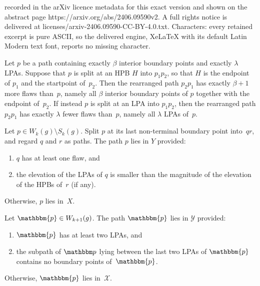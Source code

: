 \documentclass[10pt,a4paper]{amsart}
\newcommand{\lrcornerqed}[0]{}
\begin{document}
recorded in the arXiv licence metadata for this exact version and shown on the abstract page https://arxiv.org/abs/2406.09590v2. A full rights notice is delivered at licenses/arxiv-2406.09590-CC-BY-4.0.txt. Characters: every retained excerpt is pure ASCII, so the delivered engine, XeLaTeX with its default Latin Modern text font, reports no missing character.
\begin{obs}\label{obs:flaws}
    Let $p$ be a path containing exactly $\beta$ interior boundary points and exactly $\lambda$ LPAs.
    Suppose that $p$ is split at an HPB $H$ into $p_1p_2$, so that $H$ is the endpoint of $p_1$ and the startpoint of~$p_2$. Then the rearranged path $p_2p_1$ has exactly $\beta+1$ more flaws than~$p$, namely all $\beta$ interior boundary points of $p$ together with the endpoint of~$p_2$.
    If instead $p$ is split at an LPA into $p_1p_2$, then the rearranged path $p_2p_1$ has exactly $\lambda$ fewer flaws than~$p$, namely all $\lambda$ LPAs of~$p$.
    \lrcornerqed
\end{obs}

\begin{definition}
\label{def:domain_partition}
    Let $p \in W_k(g) \setminus S_k(g)$. Split $p$ at its last non-terminal boundary point into~$q r$, and regard $q$ and $r$ as paths.  
    The path $p$ lies in $Y$ provided:
    \begin{enumerate}[label=\textit{(\roman*)}]
        \item $q$ has at least one flaw, and
        \label{def:domain_partition:condition_1}
        
        \item the elevation of the LPAs of $q$ is smaller than the magnitude of the elevation of the HPBs of~$r$ (if any). 
        \label{def:domain_partition:condition_2}
    \end{enumerate}
    Otherwise, $p$ lies in~$X$. \lrcornerqed
\end{definition}

\begin{definition}
\label{def:codomain_partition}
    Let $\mathbbm{p} \in W_{k+1}(g)$. 
    The path $\mathbbm{p}$ lies in $\mathcal{Y}$ provided: 
    \begin{enumerate}[label=\textit{(\roman*)}]
        \item $\mathbbm{p}$ has at least two LPAs, and
        \label{def:codomain_partition:condition_1}
        
        \item the subpath of $\mathbbm p$ lying between the last two LPAs of $\mathbbm{p}$ contains no boundary points of~$\mathbbm{p}$.
        \label{def:codomain_partition:condition_2}
    \end{enumerate}
    Otherwise, $\mathbbm{p}$ lies in~$\mathcal{X}$. \lrcornerqed
\end{definition}
\end{document}

